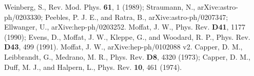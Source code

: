 \documentclass[a4paper,11pt]{article}
\begin{document}
\begin{thebibliography}{100}

 Weinberg, S., Rev. Mod. Phys. {\bf 61}, 1
(1989); Straumann, N., arXive:astro-ph/0203330; Peebles, P. J.
E., and Ratra, B., arXive:astro-ph/0207347; Ellwanger, U., arXive:hep-ph/0203252.
 Moffat, J. W.,
Phys. Rev. {\bf D41}, 1177 (1990); Evens, D., Moffat, J. W.,
Kleppe, G., and Woodard, R. P., Phys. Rev. {\bf D43}, 499
(1991).   Moffat, J. W., arXive:hep-ph/0102088
v2.   Capper, D. M., Leibbrandt, G.,
Medrano, M. R., Phys. Rev. {\bf D8}, 4320 (1973); Capper, D. M.,
Duff, M. J., and Halpern, L., Phys. Rev. {\bf 10}, 461 (1974).

\end{thebibliography}
\end{document}
